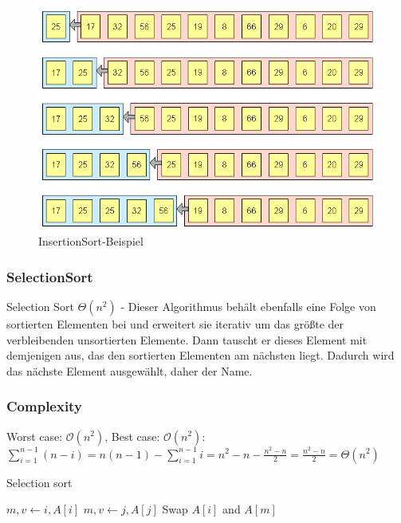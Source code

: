 \documentclass[a4paper]{article}
\begin{document}
    \begin{figure}[h]
        \centering
        \includegraphics[scale=0.3]{Pictures/insertionsort_version1.png}
        \caption{InsertionSort-Beispiel}
        \label{fig:InsertionSort}
    \end{figure}
    
  \subsubsection{SelectionSort}\label{Selectionsort}
   Selection Sort $\Theta(n^2)$ - Dieser Algorithmus behält ebenfalls eine Folge von sortierten Elementen bei und erweitert sie iterativ um das größte der verbleibenden unsortierten Elemente. Dann tauscht er dieses Element mit demjenigen aus, das den sortierten Elementen am nächsten liegt. Dadurch wird das nächste Element ausgewählt, daher der Name.
 
 \subsubsection*{Complexity}
    Worst case: $\mathcal{O}(n^2)$, Best case: $\mathcal{O}(n^2)$: \\
    $\sum_{i=1}^{n-1} (n-i) = n(n-1)-\sum_{i=1}^{n-1} i = n^2 - n - \frac{n^2-n}{2} = \frac{n^2-n}{2} = \Theta(n^2)$
    

    \begin{algorithm}[h]
        \caption{Selection sort}
        \label{alg:SelectionSort}
        \begin{algorithmic} 
          \State $m, v \gets i, A\left[i\right]$
          \State $m, v \gets j, A\left[j\right]$
          \EndIf
          \EndFor
          \State Swap $A\left[i\right]$ and $A\left[m\right]$
          \EndIf
        
          \EndFor
        \end{algorithmic}
    \end{algorithm}
    
\end{document}
